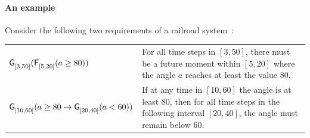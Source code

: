 \documentclass[acmsmall,screen]{acmart}
\begin{document}
\paragraph{An example}
Consider the following two requirements of a railroad system~\cite{BaeLee19}:

\begin{tcolorbox}[
    colframe=black!50, colback=white, %
    title={STL Requirements for a Railroad system from~\cite{BaeLee19}}
]
\renewcommand{\arraystretch}{1.5} %
\footnotesize
\begin{tabular}{>{\raggedright}p{5.8cm} | p{6.6cm}}
    
    $\mathop{\mathsf{\mathsf{G}}^{{}}_{[3,50]}}(\mathop{\mathsf{\mathsf{F}}^{{}}_{[5,20]}}(a \geq 80))$
    &
    For all time steps in \([3,50]\), there must be a future moment within \([5,20]\) where the angle $a$ reaches at least the value 80. \\ 
    
    $\mathop{\mathsf{\mathsf{G}}^{{}}_{[10,60]}}(a \geq 80 \rightarrow \mathop{\mathsf{\mathsf{G}}^{{}}_{[20,40]}}(a < 60))$ 
    &
    If at any time in \([10,60]\) the angle is at least 80, then for all time steps in the following interval \([20,40]\), the angle must remain below 60. \\ 
\end{tabular}
\end{tcolorbox}
\end{document}
